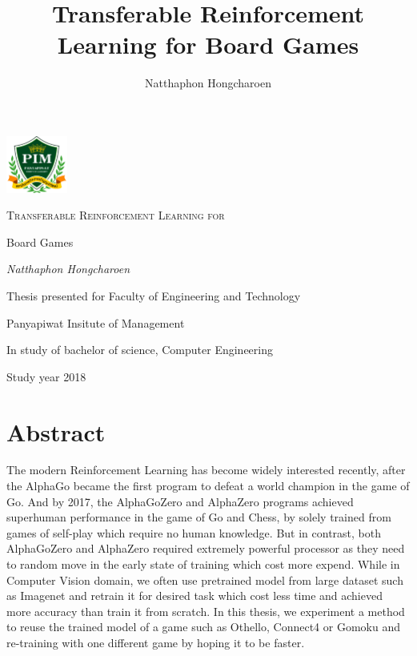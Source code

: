 \documentclass[12pt,a4paper]{article}
\title{Transferable Reinforcement Learning for Board Games}
\author{Natthaphon Hongcharoen}
\begin{document}

\begin{titlepage}
	\centering
	\includegraphics[width=0.15\textwidth]{logo.png}\par\vspace{1cm}
	{\scshape\Huge Transferable Reinforcement Learning for \par Board Games\par}
	\vfill
	{\Large\itshape Natthaphon Hongcharoen\par}
	\vfill
	{\Large  \par}
	{\large Thesis presented for Faculty of Engineering and Technology \par\vspace{0.1cm}}
	{\large Panyapiwat Insitute of Management\par\vspace{0.1cm}}
	{\large In study of bachelor of science, Computer Engineering
	}


	{\large Study year 2018 \par}
\end{titlepage}

\clearpage %
\pagestyle{empty}  %

\section*{Abstract}
\tab The modern Reinforcement Learning has become widely interested recently, after the AlphaGo\cite{AlphaGo} became the first program to defeat a world champion in the game of Go. And by 2017, the AlphaGoZero\cite{AlphaGoZero} and AlphaZero\cite{AlphaZero} programs achieved superhuman performance in the game of Go and Chess, by solely trained from games of self-play which require no human knowledge. But in contrast, both AlphaGoZero and AlphaZero required extremely powerful processor as they need to random move in the early state of training which cost more expend. While in Computer Vision domain, we often use pretrained model from large dataset such as Imagenet\cite{Imagenet} and retrain it for desired task which cost less time and achieved more accuracy than train it from scratch. In this thesis, we experiment a method to reuse the trained model of a game such as Othello, Connect4 or Gomoku and re-training with one different game by hoping it to be faster.
\clearpage
\end{document}
